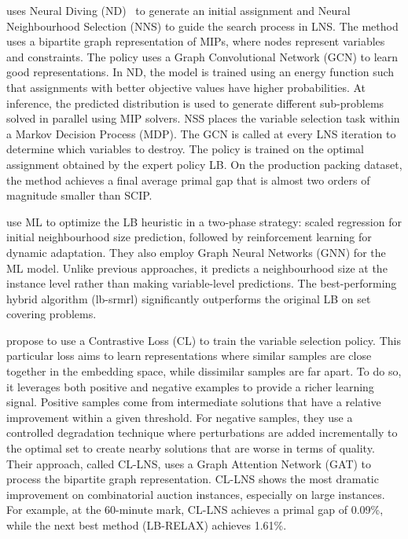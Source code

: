 \documentclass[3p, authoryear, times]{elsarticle}
\begin{document}
\cite{sonnerat_learning_2022} uses Neural Diving (ND)~\citep{nair_solving_2021} to generate an initial assignment and Neural Neighbourhood Selection (NNS) to guide the search process in LNS. The method uses a bipartite graph representation of MIPs, where nodes represent variables and constraints. The policy uses a Graph Convolutional Network (GCN) to learn good representations.  In ND, the model is trained using an energy function such that assignments with better objective values have higher probabilities. At inference, the predicted distribution is used to generate different sub-problems solved in parallel using MIP solvers. NSS places the variable selection task within a Markov Decision Process (MDP). The GCN is called at every LNS iteration to determine which variables to destroy.  The policy is trained on the optimal assignment obtained by the expert policy LB. On the production packing dataset, the method achieves a final average primal gap that is almost two orders of magnitude smaller than SCIP. 

\cite{liu_learning_2022} use ML to optimize the LB heuristic  in a  two-phase strategy: scaled regression for initial neighbourhood size prediction, followed by reinforcement learning for dynamic adaptation. They also employ Graph Neural Networks (GNN) for the ML model. Unlike previous approaches, it predicts a neighbourhood size at the instance level rather than making variable-level predictions. The best-performing hybrid algorithm (lb-srmrl) significantly outperforms the original LB on set covering problems. 

\cite{huang_searching_2023} propose to use a Contrastive Loss (CL) to train the variable selection policy. This particular loss aims to learn representations where similar samples are close together in the embedding space, while dissimilar samples are far apart. To do so, it leverages both positive and negative examples to provide a richer learning signal. Positive samples come from intermediate solutions that have a relative improvement within a given threshold. For negative samples, they use a controlled degradation technique where perturbations are added incrementally to the optimal set to create nearby solutions that are worse in terms of quality. Their approach, called CL-LNS, uses a Graph Attention Network (GAT) to process the bipartite graph representation. CL-LNS shows the most dramatic improvement on combinatorial auction instances, especially on large instances. For example, at the 60-minute mark, CL-LNS achieves a primal gap of 0.09\%, while the next best method (LB-RELAX) achieves 1.61\%. 
\end{document}
